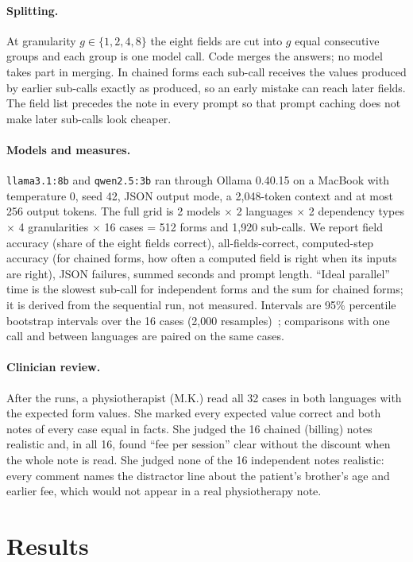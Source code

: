 \documentclass[11pt,a4paper]{article}
\newcommand{\code}[1]{\texttt{#1}}
\begin{document}
\paragraph{Splitting.} At granularity $g \in \{1,2,4,8\}$ the eight fields are cut into $g$ equal consecutive groups
and each group is one model call. Code merges the answers; no model takes part in merging. In chained forms each
sub-call receives the values produced by earlier sub-calls exactly as produced, so an early mistake can reach later
fields. The field list precedes the note in every prompt so that prompt caching does not make later sub-calls look
cheaper.

\paragraph{Models and measures.} \code{llama3.1:8b} and \code{qwen2.5:3b} ran through Ollama 0.40.15 on a MacBook with
temperature 0, seed 42, JSON output mode, a 2,048-token context and at most 256 output tokens. The full grid is 2 models
$\times$ 2 languages $\times$ 2 dependency types $\times$ 4 granularities $\times$ 16 cases = 512 forms and 1,920
sub-calls. We report field accuracy (share of the eight fields correct), all-fields-correct, computed-step accuracy
(for chained forms, how often a computed field is right when its inputs are right), JSON failures, summed seconds and
prompt length. ``Ideal parallel'' time is the slowest sub-call for independent forms and the sum for chained forms; it
is derived from the sequential run, not measured. Intervals are 95\% percentile bootstrap intervals over the 16 cases
(2,000 resamples)~\cite{efron1993bootstrap}; comparisons with one call and between languages are paired on the same
cases.

\paragraph{Clinician review.} After the runs, a physiotherapist (M.K.) read all 32 cases in both languages with the expected form values. She marked every expected value correct and both notes of every case equal in facts. She judged the 16 chained (billing) notes realistic and, in all 16, found ``fee per session'' clear without the discount when the whole note is read. She judged none of the 16 independent notes realistic: every comment names the distractor line about the patient's brother's age and earlier fee, which would not appear in a real physiotherapy note.

\section{Results}
\end{document}
